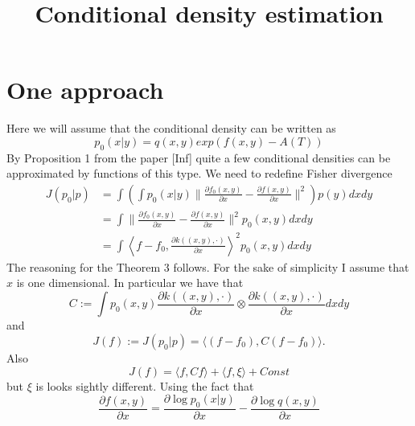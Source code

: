\documentclass[10pt]{article}
\title{Conditional density estimation}
\begin{document}
\maketitle

\begin{abstract}
\end{abstract}




\section{One approach}
\label{sec:option1}
Here we will assume that the conditional density can be written as 
\begin{equation}
p_0(x|y) = q(x,y)exp(f(x,y) - A(T))
\end{equation} 
By Proposition 1 from the paper [Inf] quite a few conditional densities can be approximated by functions of this type. We need to redefine Fisher divergence   
\begin{align}
J(p_0|p) &= \int \left( \int p_0(x|y) \parallel \frac{\partial  f_0(x,y)} {\partial x} -\frac{\partial  f(x,y)} {\partial x} \parallel^2 \right )p(y) dx dy  \\
&=  \int  \parallel \frac{\partial  f_0(x,y)} {\partial x} -\frac{\partial  f(x,y)} {\partial x} \parallel^2 p_0(x,y) dx dy \\
&=  \int   \left \langle f-f_0,\frac{\partial  k( (x,y), \cdot)} {\partial x} \right \rangle^2    p_0(x,y) dx dy
\end{align}
The reasoning for the Theorem 3 follows. For the sake of simplicity I assume that $x$ is one dimensional. In particular we have that 
\begin{equation}
 C := \int  p_0(x,y) \frac{\partial  k( (x,y), \cdot)} {\partial x} \otimes \frac{\partial  k( (x,y), \cdot)} {\partial x} dx dy
\end{equation}
and 
\begin{equation}
 J(f) := J(p_0|p) = \langle (f -f_0),C(f -f_0) \rangle.
\end{equation}
Also 
\begin{equation}
 J(f) = \langle f,Cf \rangle + \langle f,\xi \rangle + Const
\end{equation}
but $\xi$ is looks sightly different. Using the fact that
\begin{equation}
 \frac{\partial  f(x,y)} {\partial x}  = \frac{\partial  \log p_0(x|y)}{\partial x} - \frac{\partial  \log q(x,y)}{\partial x}
\end{equation}
\end{document}
